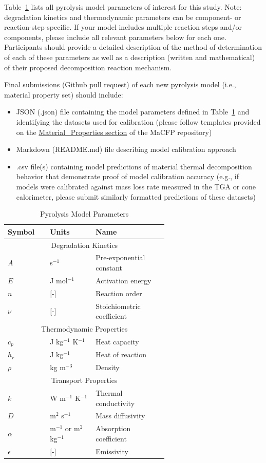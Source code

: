 \documentclass[12pt]{article}
\begin{document}
Table~\ref{table:properties} lists all pyrolysis model parameters of interest for this study. Note: degradation kinetics and thermodynamic parameters can be component- or reaction-step-specific. If your model includes multiple reaction steps and/or components, please include all relevant parameters below for each one. Participants should provide a detailed description of the method of determination of each of these parameters as well as a description (written and mathematical) of their proposed decomposition reaction mechanism.

Final submissions (Github pull request) of each new pyrolysis model (i.e., material property set) should include:
\begin{itemize}[noitemsep]
\item JSON (.json) file containing the model parameters defined in Table~\ref{table:properties} and identifying the datasets used for calibration (please follow templates provided on the \href{https://github.com/MaCFP/matl-db/tree/master/PMMA/Material_Properties}{Material\_Properties section} of the MaCFP repository)
\item Markdown (README.md) file describing model calibration approach
\item .csv file(s) containing model predictions of material thermal decomposition behavior that demonstrate proof of model calibration accuracy (e.g., if models were calibrated against mass loss rate measured in the TGA or cone calorimeter, please submit similarly formatted predictions of these datasets)
\end{itemize}


\begin{table}[htb]
\centering
\caption{ Pyrolysis Model Parameters}
\label{table:properties}
\begin{tabular}{p{0.125\linewidth} | p{0.2\linewidth}| p{0.3\linewidth}}
\hline
\textbf{Symbol}         & \textbf{Units} & \textbf{Name}\\
\hline
\multicolumn{3}{c}{Degradation Kinetics}\\
\hline
$A$ &s$^{-1}$   &Pre-exponential constant \\
$E$ &J mol$^{-1}$ &Activation energy \\
$n$ &[-]    &Reaction order\\
$\nu$ &[-]    &Stoichiometric coefficient\\
\hline
\multicolumn{3}{c}{Thermodynamic Properties}\\
\hline
$c_p$ &J kg$^{-1}$ K$^{-1}$ &Heat capacity\\
$h_r$ &J kg$^{-1}$    &Heat of reaction\\
$\rho$  &kg m$^{-3}$    &Density\\
\hline
\multicolumn{3}{c}{Transport Properties}\\
\hline
$k$ &W m$^{-1}$ K$^{-1}$  &Thermal conductivity\\
$D$ &m$^2$ s$^{-1}$   &Mass diffusivity\\
$\alpha$  &m$^{-1}$ or m$^2$ kg$^{-1}$  &Absorption coefficient\\
$\epsilon$  &[-]        &Emissivity\\
\hline
\end{tabular}
\end{table}
\end{document}
